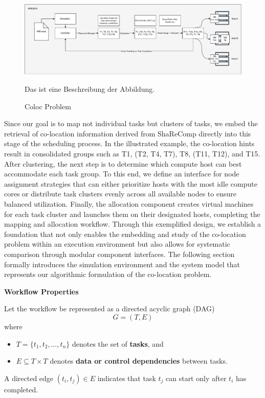 \begin{figure}[H]
    \centering
    \includegraphics[scale=0.45]{fig/04/04-coloc-problem.pdf}
    \caption{Coloc Problem}
    \label{fig:04-coloc-problem}
    \tiny
    Das ist eine Beschreibung der Abbildung.
\end{figure}

Since our goal is to map not individual tasks but clusters of tasks, we embed the retrieval of co-location information derived from ShaReComp directly into this stage of the scheduling process. In the illustrated example, the co-location hints result in consolidated groups such as T1, (T2, T4, T7), T8, (T11, T12), and T15. After clustering, the next step is to determine which compute host can best accommodate each task group. To this end, we define an interface for node assignment strategies that can either prioritize hosts with the most idle compute cores or distribute task clusters evenly across all available nodes to ensure balanced utilization. Finally, the allocation component creates virtual machines for each task cluster and launches them on their designated hosts, completing the mapping and allocation workflow. Through this exemplified design, we establish a foundation that not only enables the embedding and study of the co-location problem within an execution environment but also allows for systematic comparison through modular component interfaces. The following section formally introduces the simulation environment and the system model that represents our algorithmic formulation of the co-location problem.


\textbf{Workflow Properties}

Let the workflow be represented as a directed acyclic graph (DAG)
\[
    G = (T, E)
\]
where
\begin{itemize}
    \item $T = \{t_1, t_2, \dots, t_n\}$ denotes the set of \textbf{tasks}, and
    \item $E \subseteq T \times T$ denotes \textbf{data or control dependencies} between tasks.
\end{itemize}
A directed edge $(t_i, t_j) \in E$ indicates that task $t_j$ can start only after $t_i$ has completed.

